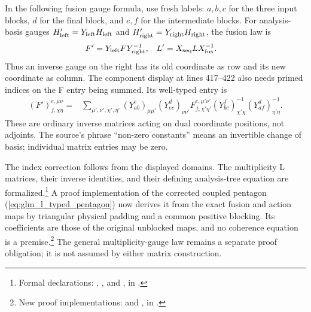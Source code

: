 \documentclass{article}
\begin{document}
In the following fusion gauge formula, use fresh labels: $a,b,c$ for the
three input blocks, $d$ for the final block, and $e,f$ for the intermediate
blocks. For analysis-basis gauges $H'_{\rm left}=Y_{\rm left}H_{\rm left}$ and
$H'_{\rm right}=Y_{\rm right}H_{\rm right}$, the fusion law is
\begin{align}
    F' & =Y_{\rm left}F Y_{\rm right}^{-1}, &
    L' & =X_{\rm seq}L X_{\rm fus}^{-1}.
    \label{eq:glm_l_gauge_matrices}
\end{align}
Thus an inverse gauge on the right has its old coordinate as row and its
new coordinate as column. The component display at lines 417--422 also
needs primed indices on the F entry being summed. Its well-typed entry is
\begin{align}
    (F')_{f,\chi\eta}^{e,\mu\nu}
    ={} & \sum_{\mu',\nu',\chi',\eta'}
    (Y_{ab}^{e})_{\mu\mu'}(Y_{ec}^{d})_{\nu\nu'}
    F_{f,\chi'\eta'}^{e,\mu'\nu'}
    (Y_{bc}^{f})^{-1}_{\chi'\chi}
    (Y_{af}^{d})^{-1}_{\eta'\eta}.
    \label{eq:glm_l_typed_f_gauge}
\end{align}
These are ordinary inverse matrices acting on dual coordinate positions,
not adjoints. The source's phrase ``non-zero constants'' means an
invertible change of basis; individual matrix entries may be zero.

The index correction follows from the displayed domains. The multiplicity
L matrices, their inverse identities, and their defining analysis-tree
equation are formalized.\footnote{Formal declarations:
    ,
    , and
    , in
    .}
A proof implementation of the corrected coupled pentagon
(\ref{eq:glm_l_typed_pentagon}) now derives it from the exact fusion and
action maps by triangular physical padding and a common positive blocking.
Its coefficients are those of the original unblocked maps, and no
coherence equation is a premise.\footnote{New proof implementations:
     and
    , in
    .}
The general multiplicity-gauge law remains a separate proof obligation;
it is not assumed by either matrix construction.



\end{document}
